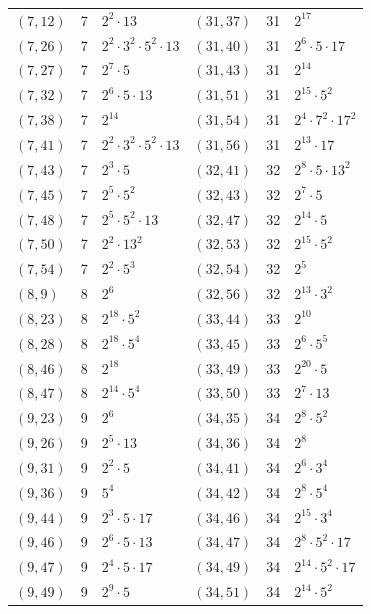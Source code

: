 \documentclass[11pt]{article}
\begin{document}
\begin{longtable}{@{}lrl@{\qquad}lrl@{}}
$(7,12)$ & 7 & $2^{2}\cdot 13$ & $(31,37)$ & 31 & $2^{17}$\\
$(7,26)$ & 7 & $2^{2}\cdot 3^{2}\cdot 5^{2}\cdot 13$ & $(31,40)$ & 31 & $2^{6}\cdot 5\cdot 17$\\
$(7,27)$ & 7 & $2^{7}\cdot 5$ & $(31,43)$ & 31 & $2^{14}$\\
$(7,32)$ & 7 & $2^{6}\cdot 5\cdot 13$ & $(31,51)$ & 31 & $2^{15}\cdot 5^{2}$\\
$(7,38)$ & 7 & $2^{14}$ & $(31,54)$ & 31 & $2^{4}\cdot 7^{2}\cdot 17^{2}$\\
$(7,41)$ & 7 & $2^{2}\cdot 3^{2}\cdot 5^{2}\cdot 13$ & $(31,56)$ & 31 & $2^{13}\cdot 17$\\
$(7,43)$ & 7 & $2^{3}\cdot 5$ & $(32,41)$ & 32 & $2^{8}\cdot 5\cdot 13^{2}$\\
$(7,45)$ & 7 & $2^{5}\cdot 5^{2}$ & $(32,43)$ & 32 & $2^{7}\cdot 5$\\
$(7,48)$ & 7 & $2^{5}\cdot 5^{2}\cdot 13$ & $(32,47)$ & 32 & $2^{14}\cdot 5$\\
$(7,50)$ & 7 & $2^{2}\cdot 13^{2}$ & $(32,53)$ & 32 & $2^{15}\cdot 5^{2}$\\
$(7,54)$ & 7 & $2^{2}\cdot 5^{3}$ & $(32,54)$ & 32 & $2^{5}$\\
$(8,9)$ & 8 & $2^{6}$ & $(32,56)$ & 32 & $2^{13}\cdot 3^{2}$\\
$(8,23)$ & 8 & $2^{18}\cdot 5^{2}$ & $(33,44)$ & 33 & $2^{10}$\\
$(8,28)$ & 8 & $2^{18}\cdot 5^{4}$ & $(33,45)$ & 33 & $2^{6}\cdot 5^{5}$\\
$(8,46)$ & 8 & $2^{18}$ & $(33,49)$ & 33 & $2^{20}\cdot 5$\\
$(8,47)$ & 8 & $2^{14}\cdot 5^{4}$ & $(33,50)$ & 33 & $2^{7}\cdot 13$\\
$(9,23)$ & 9 & $2^{6}$ & $(34,35)$ & 34 & $2^{8}\cdot 5^{2}$\\
$(9,26)$ & 9 & $2^{5}\cdot 13$ & $(34,36)$ & 34 & $2^{8}$\\
$(9,31)$ & 9 & $2^{2}\cdot 5$ & $(34,41)$ & 34 & $2^{6}\cdot 3^{4}$\\
$(9,36)$ & 9 & $5^{4}$ & $(34,42)$ & 34 & $2^{8}\cdot 5^{4}$\\
$(9,44)$ & 9 & $2^{3}\cdot 5\cdot 17$ & $(34,46)$ & 34 & $2^{15}\cdot 3^{4}$\\
$(9,46)$ & 9 & $2^{6}\cdot 5\cdot 13$ & $(34,47)$ & 34 & $2^{8}\cdot 5^{2}\cdot 17$\\
$(9,47)$ & 9 & $2^{4}\cdot 5\cdot 17$ & $(34,49)$ & 34 & $2^{14}\cdot 5^{2}\cdot 17$\\
$(9,49)$ & 9 & $2^{9}\cdot 5$ & $(34,51)$ & 34 & $2^{14}\cdot 5^{2}$\\

\end{longtable}
\end{document}
